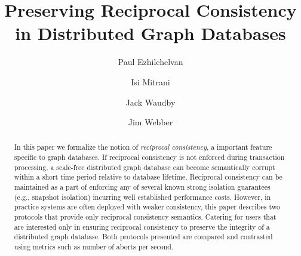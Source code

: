 \documentclass[sigplan,screen]{acmart}
\begin{document}
\title{Preserving Reciprocal Consistency in Distributed Graph Databases}

\author{Paul Ezhilchelvan}

\author{Isi Mitrani}

\author{Jack Waudby}

\author{Jim Webber}



\renewcommand{\shortauthors}{Ezhilchelvan, et al.}

\begin{abstract}

  In this paper we formalize the notion of \textit{reciprocal consistency}, a important feature specific to graph databases. If reciprocal consistency is not enforced during transaction processing, a scale-free distributed graph database can become semantically corrupt within a short time period relative to database lifetime. Reciprocal consistency can be maintained as a part of enforcing any of several known strong isolation guarantees (e.g., snapshot isolation) incurring well established performance costs. However, in practice systems are often deployed with weaker consistency, this paper describes two protocols that provide only reciprocal consistency semantics. Catering for users that are interested only in ensuring reciprocal consistency to preserve the integrity of a distributed graph database. Both protocols presented are compared and contrasted using metrics such as number of aborts per second.


\end{abstract}
\end{document}
